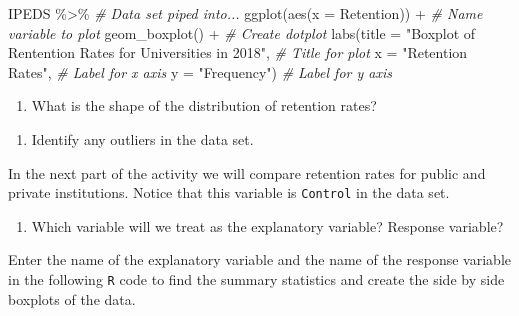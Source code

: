 \documentclass[
]{report}
\newenvironment{Shaded}{\begin{snugshade}}{\end{snugshade}}
\newcommand{\AttributeTok}[1]{\textcolor[rgb]{0.77,0.63,0.00}{#1}}
\newcommand{\CommentTok}[1]{\textcolor[rgb]{0.56,0.35,0.01}{\textit{#1}}}
\newcommand{\FunctionTok}[1]{\textcolor[rgb]{0.00,0.00,0.00}{#1}}
\newcommand{\NormalTok}[1]{#1}
\newcommand{\SpecialCharTok}[1]{\textcolor[rgb]{0.00,0.00,0.00}{#1}}
\newcommand{\StringTok}[1]{\textcolor[rgb]{0.31,0.60,0.02}{#1}}
\providecommand{\tightlist}{%
  \setlength{\itemsep}{0pt}\setlength{\parskip}{0pt}}
\begin{document}
\begin{Shaded}
\begin{Highlighting}[]
\NormalTok{IPEDS }\SpecialCharTok{\%\textgreater{}\%} \CommentTok{\# Data set piped into...}
\FunctionTok{ggplot}\NormalTok{(}\FunctionTok{aes}\NormalTok{(}\AttributeTok{x =}\NormalTok{ Retention)) }\SpecialCharTok{+}   \CommentTok{\# Name variable to plot}
  \FunctionTok{geom\_boxplot}\NormalTok{() }\SpecialCharTok{+}  \CommentTok{\# Create dotplot}
  \FunctionTok{labs}\NormalTok{(}\AttributeTok{title =} \StringTok{"Boxplot of Rentention Rates for Universities in 2018"}\NormalTok{, }\CommentTok{\# Title for plot}
       \AttributeTok{x =} \StringTok{"Retention Rates"}\NormalTok{, }\CommentTok{\# Label for x axis}
       \AttributeTok{y =} \StringTok{"Frequency"}\NormalTok{) }\CommentTok{\# Label for y axis}
\end{Highlighting}
\end{Shaded}

\begin{enumerate}
\def\labelenumi{\arabic{enumi}.}
\setcounter{enumi}{8}
\tightlist
\item
  What is the shape of the distribution of retention rates?
\end{enumerate}

\vspace{0.3in}

\begin{enumerate}
\def\labelenumi{\arabic{enumi}.}
\setcounter{enumi}{9}
\tightlist
\item
  Identify any outliers in the data set.
\end{enumerate}

\vspace{0.3in}

In the next part of the activity we will compare retention rates for public and private institutions. Notice that this variable is \texttt{Control} in the data set.

\begin{enumerate}
\def\labelenumi{\arabic{enumi}.}
\setcounter{enumi}{10}
\tightlist
\item
  Which variable will we treat as the explanatory variable? Response variable?
\end{enumerate}

\vspace{0.8in}

Enter the name of the explanatory variable and the name of the response variable in the following \texttt{R} code to find the summary statistics and create the side by side boxplots of the data.
\end{document}
